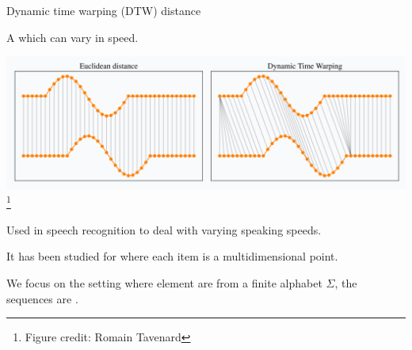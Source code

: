 \begin{frame}{Dynamic time warping (DTW) distance }

A  which can vary in speed.

\begin{center}
\includegraphics[scale=0.3]{figures/dtw_vs_euc.png}\footnote{Figure credit: Romain Tavenard}
\end{center}
\pause
Used in speech recognition to deal with varying speaking speeds.\pause

It has been studied for  where each item is a multidimensional point.

We focus on the setting where element are from a finite alphabet $\Sigma$, the sequences are .

\end{frame}


